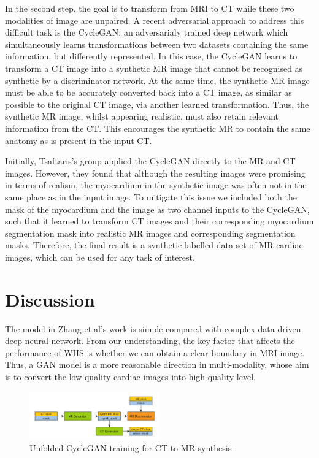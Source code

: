 \documentclass[10pt,sigconf,letterpaper,nonacm]{acmart}
\begin{document}
 In the second step, the goal is to transform from MRI to CT while these two modalities of image are unpaired. A recent adversarial approach to address this difficult task is the CycleGAN\cite{zhu2017unpaired}: an adversarialy trained deep network which simultaneously learns transformations between two datasets containing the same information, but differently represented. In this case, the CycleGAN learns to transform a CT image into a synthetic MR image that cannot be recognised as synthetic by a discriminator network. At the same time, the synthetic MR image must be able to be accurately converted back into a CT image, as similar as possible to the original CT image, via another learned transformation. Thus, the synthetic MR image, whilst appearing realistic, must also retain relevant information from the CT. This encourages the synthetic MR to contain the same anatomy as is present in the input CT. 
 
 Initially, Tsaftaris's group applied the CycleGAN directly to the MR and CT images. However, they found that although the resulting images were promising in terms of realism, the myocardium in the synthetic image was often not in the same place as in the input image. To mitigate this issue we included both the mask of the myocardium and the image as two channel inputs to the CycleGAN, such that it learned to transform CT images and their corresponding myocardium segmentation mask into realistic MR images and corresponding segmentation masks. Therefore, the final result is a synthetic labelled data set of MR cardiac images, which can be used for any task of interest.
 
 \section{Discussion}
 The model in Zhang et.al's work\cite{zhuang2016multi} is simple compared with complex data driven deep neural network. From our understanding, the key factor that affects the performance of WHS is whether we can obtain a clear boundary in MRI image. Thus, a GAN model is a more reasonable direction in multi-modality, whose aim is to convert the low quality cardiac images into high quality level. 

\begin{figure}
	\centering
	\includegraphics[width=0.5\textwidth]{images/Xiangyu_CycleGAN.png}
	\caption{Unfolded CycleGAN\cite{zhu2017unpaired} training for CT to MR synthesis}
	\label{Xiangyu_CycleGAN}
\end{figure} 

\setcounter{page}{1}


\end{document}
